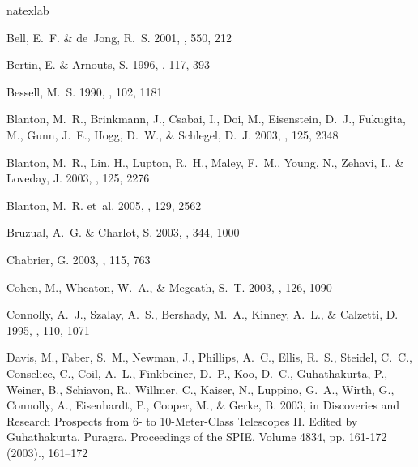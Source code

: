 \documentclass[10pt,preprint]{aastex}
\begin{document}
\begin{thebibliography}{39}
\expandafter\ifx\csname natexlab\endcsname\relax\def\natexlab#1{#1}\fi

{Bell}, E.~F. \& {de~Jong}, R.~S. 2001, \apj, 550, 212

{Bertin}, E. \& {Arnouts}, S. 1996, \aaps, 117, 393

{Bessell}, M.~S. 1990, \pasp, 102, 1181

Blanton, M.~R., Brinkmann, J., Csabai, I., Doi, M., Eisenstein, D.~J.,
  Fukugita, M., Gunn, J.~E., Hogg, D.~W., \& Schlegel, D.~J. 2003, \aj, 125,
  2348

{Blanton}, M.~R., {Lin}, H., {Lupton}, R.~H., {Maley}, F.~M., {Young}, N.,
  {Zehavi}, I., \& {Loveday}, J. 2003, \aj, 125, 2276

{Blanton}, M.~R. {et~al.} 2005, \aj, 129, 2562

Bruzual, A.~G. \& Charlot, S. 2003, \mnras, 344, 1000

{Chabrier}, G. 2003, \pasp, 115, 763

{Cohen}, M., {Wheaton}, W.~A., \& {Megeath}, S.~T. 2003, \aj, 126, 1090

{Connolly}, A.~J., {Szalay}, A.~S., {Bershady}, M.~A., {Kinney}, A.~L., \&
  {Calzetti}, D. 1995, \aj, 110, 1071

{Davis}, M., {Faber}, S.~M., {Newman}, J., {Phillips}, A.~C., {Ellis}, R.~S.,
  {Steidel}, C.~C., {Conselice}, C., {Coil}, A.~L., {Finkbeiner}, D.~P., {Koo},
  D.~C., {Guhathakurta}, P., {Weiner}, B., {Schiavon}, R., {Willmer}, C.,
  {Kaiser}, N., {Luppino}, G.~A., {Wirth}, G., {Connolly}, A., {Eisenhardt},
  P., {Cooper}, M., \& {Gerke}, B. 2003, in Discoveries and Research Prospects
  from 6- to 10-Meter-Class Telescopes II. Edited by Guhathakurta, Puragra.
  Proceedings of the SPIE, Volume 4834, pp. 161-172 (2003)., 161--172


\end{thebibliography}
\end{document}
